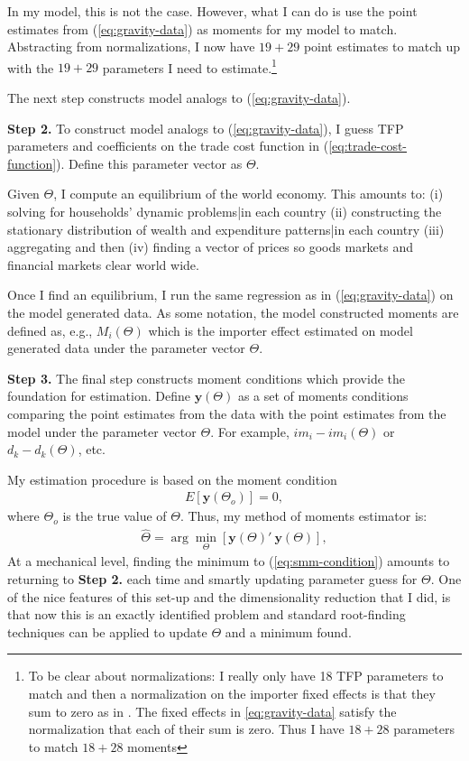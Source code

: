 \documentclass[12pt,pdftex]{article}
\begin{document}
\begin{onehalfspacing}
In my model, this is not the case. However, what I can do is use the point estimates from (\ref{eq:gravity-data}) as moments for my model to match. Abstracting from normalizations, I now have $19 + 29$ point estimates to match up with the $19 + 29$ parameters I need to estimate.\footnote{To be clear about normalizations: I really only have 18 TFP parameters to match and then a normalization on the importer fixed effects is that they sum to zero as in \citet{eaton2002technology}. The fixed effects in \ref{eq:gravity-data} satisfy the normalization that each of their sum is zero. Thus I have $18 + 28$ parameters to match $18 + 28$ moments}

The next step constructs model analogs to (\ref{eq:gravity-data}).

\textbf{Step 2.} To construct model analogs to (\ref{eq:gravity-data}), I guess TFP parameters and coefficients on the trade cost function in (\ref{eq:trade-cost-function}). Define this parameter vector as $\Theta$.

Given $\Theta$, I compute an equilibrium of the world economy. This amounts to: (i) solving for households' dynamic problems|in each country (ii) constructing the stationary distribution of wealth and expenditure patterns|in each country (iii) aggregating and then (iv) finding a vector of prices so goods markets and financial markets clear world wide.

Once I find an equilibrium, I run the same regression as in (\ref{eq:gravity-data}) on the model generated data. As some notation, the model constructed moments are defined as, e.g., $M_{i}(\Theta)$ which is the importer effect estimated on model generated data under the parameter vector $\Theta$.

\textbf{Step 3.} The final step constructs moment conditions which provide the foundation for estimation. Define $\mathbf{y}(\Theta)$ as a set of moments conditions comparing the point estimates from the data with the point estimates from the model under the parameter vector $\Theta$. For example, ${im_{i}} - im_{i}(\Theta)$ or $d_k - d_k(\Theta)$, etc.

My estimation procedure is based on the moment condition
\begin{align}
E\left[\mathbf{y}(\Theta_o)\right] = 0,
\end{align}
where $\Theta_o$ is the true value of $\Theta$. Thus, my method of moments estimator is:
\begin{align}
\hat{\Theta} = \arg\min_{\Theta} \left[\mathbf{y}(\Theta)'\ \mathbf{y}(\Theta)\right], \label{eq:smm-condition}
\end{align}
At a mechanical level, finding the minimum to (\ref{eq:smm-condition}) amounts to returning to \textbf{Step 2.} each time and smartly updating parameter guess for $\Theta$. One of the nice features of this set-up and the dimensionality reduction that I did, is that now this is an exactly identified problem and standard root-finding techniques can be applied to update $\Theta$ and a minimum found.


\end{onehalfspacing}
\end{document}

